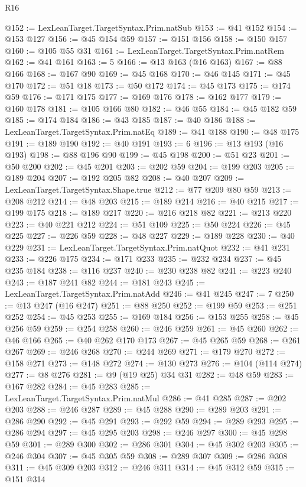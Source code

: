 \begin{lexlean}{R16}
\begin{coremodule}
@152 := LexLeanTarget.TargetSyntax.Prim.natSub
@153 := @41 @152
@154 := @153 @127
@156 := @45 @154 @59
@157 := @151 @156
@158 := @150 @157
@160 := @105 @55 @31
@161 := LexLeanTarget.TargetSyntax.Prim.natRem
@162 := @41 @161
@163 := 5
@166 := @13 @163 (@16 @163)
@167 := @88 @166
@168 := @167 @90
@169 := @45 @168
@170 := @46 @145
@171 := @45 @170
@172 := @51 @18
@173 := @50 @172
@174 := @45 @173
@175 := @174 @59
@176 := @171 @175
@177 := @169 @176
@178 := @162 @177
@179 := @160 @178
@181 := @105 @166 @80
@182 := @46 @55
@184 := @45 @182 @59
@185 := @174 @184
@186 := @43 @185
@187 := @40 @186
@188 := LexLeanTarget.TargetSyntax.Prim.natEq
@189 := @41 @188
@190 := @48 @175
@191 := @189 @190
@192 := @40 @191
@193 := 6
@196 := @13 @193 (@16 @193)
@198 := @88 @196 @90
@199 := @45 @198
@200 := @51 @23
@201 := @50 @200
@202 := @45 @201
@203 := @202 @59
@204 := @199 @203
@205 := @189 @204
@207 := @192 @205 @82
@208 := @40 @207
@209 := LexLeanTarget.TargetSyntax.Shape.true
@212 := @77 @209 @80 @59
@213 := @208 @212
@214 := @48 @203
@215 := @189 @214
@216 := @40 @215
@217 := @199 @175
@218 := @189 @217
@220 := @216 @218 @82
@221 := @213 @220
@223 := @40 @221 @212
@224 := @51 @109
@225 := @50 @224
@226 := @45 @225
@227 := @226 @59
@228 := @48 @227
@229 := @189 @228
@230 := @40 @229
@231 := LexLeanTarget.TargetSyntax.Prim.natQuot
@232 := @41 @231
@233 := @226 @175
@234 := @171 @233
@235 := @232 @234
@237 := @45 @235 @184
@238 := @116 @237
@240 := @230 @238 @82
@241 := @223 @240
@243 := @187 @241 @82
@244 := @181 @243
@245 := LexLeanTarget.TargetSyntax.Prim.natAdd
@246 := @41 @245
@247 := 7
@250 := @13 @247 (@16 @247)
@251 := @88 @250
@252 := @199 @59
@253 := @251 @252
@254 := @45 @253
@255 := @169 @184
@256 := @153 @255
@258 := @45 @256 @59
@259 := @254 @258
@260 := @246 @259
@261 := @45 @260
@262 := @46 @166
@265 := @40 @262 @170 @173
@267 := @45 @265 @59
@268 := @261 @267
@269 := @246 @268
@270 := @244 @269
@271 := @179 @270
@272 := @158 @271
@273 := @148 @272
@274 := @130 @273
@276 := @104 (@114 @274)
@277 := @8 @276
@281 := @9 (@19 @25) @34 @31
@282 := @48 @59
@283 := @167 @282
@284 := @45 @283
@285 := LexLeanTarget.TargetSyntax.Prim.natMul
@286 := @41 @285
@287 := @202 @203
@288 := @246 @287
@289 := @45 @288
@290 := @289 @203
@291 := @286 @290
@292 := @45 @291
@293 := @292 @59
@294 := @289 @293
@295 := @286 @294
@297 := @45 @295 @203
@298 := @246 @297
@300 := @45 @298 @59
@301 := @289 @300
@302 := @286 @301
@304 := @45 @302 @203
@305 := @246 @304
@307 := @45 @305 @59
@308 := @289 @307
@309 := @286 @308
@311 := @45 @309 @203
@312 := @246 @311
@314 := @45 @312 @59
@315 := @151 @314

\end{coremodule}
\end{lexlean}
